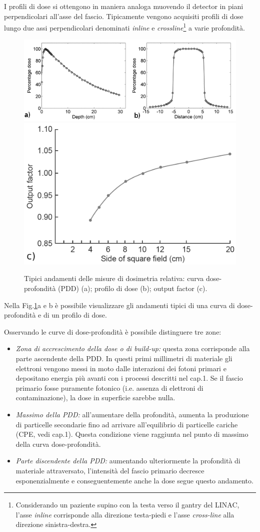 I profili di dose si ottengono in maniera analoga muovendo il detector in piani perpendicolari all'asse del fascio. Tipicamente vengono acquisiti profili di dose lungo due assi perpendicolari denominati \textit{inline} e \textit{crossline}\footnote{Considerando un paziente supino con la testa verso il gantry del LINAC, l'asse \textit{inline} corrisponde alla direzione testa-piedi e l'asse \textit{cross-line} alla direzione sinistra-destra.} a varie profondità.\\
\begin{figure}[!t]
\centering
\includegraphics[width=\textwidth]{./cap2/pdd_prof.png}\\
\includegraphics[width=.5\textwidth]{./cap2/of.png}
\caption{Tipici andamenti delle misure di dosimetria relativa: curva dose-profondità (PDD) (a); profilo di dose (b); output factor (c).}
\label{fig:pdd_prof}
\end{figure}
Nella Fig.\ref{fig:pdd_prof}a e b è possibile visualizzare gli andamenti tipici di una curva di dose-profondità e di un profilo di dose.

Osservando le curve di dose-profondità è possibile distinguere tre zone:
\begin{itemize}
\item \textit{Zona di accrescimento della dose o di build-up:} questa zona corrisponde alla parte ascendente della PDD. In questi primi millimetri di materiale gli elettroni vengono messi in moto dalle interazioni dei fotoni primari e depositano energia più avanti con i processi descritti nel cap.1. Se il fascio primario fosse puramente fotonico (i.e. assenza di elettroni di contaminazione), la dose in superficie sarebbe nulla.
\item \textit{Massimo della PDD:} all'aumentare della profondità, aumenta la produzione di particelle secondarie fino ad arrivare all'equilibrio di particelle cariche (CPE, vedi cap.1). Questa condizione viene raggiunta nel punto di massimo della curva dose-profondità.
\item \textit{Parte discendente della PDD:} aumentando ulteriormente la profondità di materiale attraversato, l'intensità del fascio primario decresce esponenzialmente e conseguentemente anche la dose segue questo andamento.
\end{itemize}

